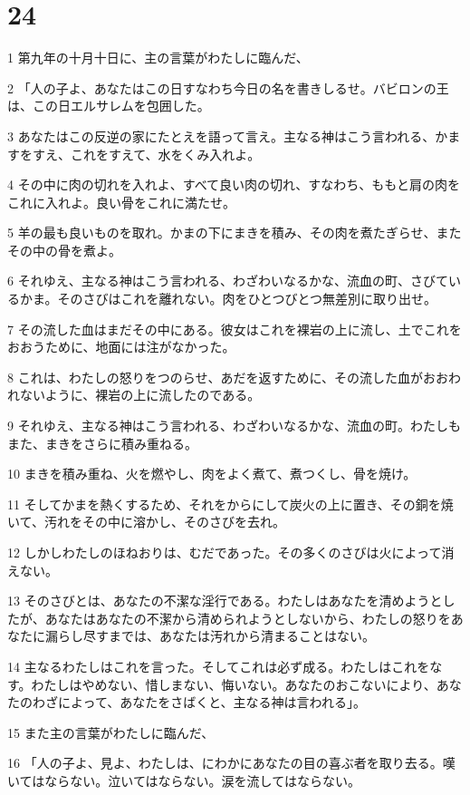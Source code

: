 \chapter{24}

\par 1 第九年の十月十日に、主の言葉がわたしに臨んだ、
\par 2 「人の子よ、あなたはこの日すなわち今日の名を書きしるせ。バビロンの王は、この日エルサレムを包囲した。
\par 3 あなたはこの反逆の家にたとえを語って言え。主なる神はこう言われる、かますをすえ、これをすえて、水をくみ入れよ。
\par 4 その中に肉の切れを入れよ、すべて良い肉の切れ、すなわち、ももと肩の肉をこれに入れよ。良い骨をこれに満たせ。
\par 5 羊の最も良いものを取れ。かまの下にまきを積み、その肉を煮たぎらせ、またその中の骨を煮よ。
\par 6 それゆえ、主なる神はこう言われる、わざわいなるかな、流血の町、さびているかま。そのさびはこれを離れない。肉をひとつびとつ無差別に取り出せ。
\par 7 その流した血はまだその中にある。彼女はこれを裸岩の上に流し、土でこれをおおうために、地面には注がなかった。
\par 8 これは、わたしの怒りをつのらせ、あだを返すために、その流した血がおおわれないように、裸岩の上に流したのである。
\par 9 それゆえ、主なる神はこう言われる、わざわいなるかな、流血の町。わたしもまた、まきをさらに積み重ねる。
\par 10 まきを積み重ね、火を燃やし、肉をよく煮て、煮つくし、骨を焼け。
\par 11 そしてかまを熱くするため、それをからにして炭火の上に置き、その銅を焼いて、汚れをその中に溶かし、そのさびを去れ。
\par 12 しかしわたしのほねおりは、むだであった。その多くのさびは火によって消えない。
\par 13 そのさびとは、あなたの不潔な淫行である。わたしはあなたを清めようとしたが、あなたはあなたの不潔から清められようとしないから、わたしの怒りをあなたに漏らし尽すまでは、あなたは汚れから清まることはない。
\par 14 主なるわたしはこれを言った。そしてこれは必ず成る。わたしはこれをなす。わたしはやめない、惜しまない、悔いない。あなたのおこないにより、あなたのわざによって、あなたをさばくと、主なる神は言われる」。
\par 15 また主の言葉がわたしに臨んだ、
\par 16 「人の子よ、見よ、わたしは、にわかにあなたの目の喜ぶ者を取り去る。嘆いてはならない。泣いてはならない。涙を流してはならない。
